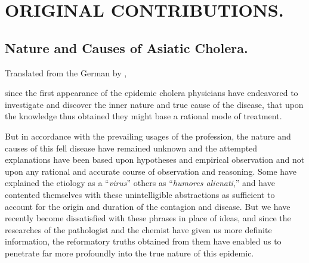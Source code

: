 
\chapter*[Original Contributions.]{ORIGINAL CONTRIBUTIONS.}

\section*{Nature and Causes of Asiatic Cholera.}


\footnotesize
\begin{center}Translated from the German by , \md\end{center}
\normalsize

 since the first appearance of the epidemic cholera physicians
have endeavored to investigate and discover the inner nature and true
cause of the disease, that upon the knowledge thus obtained they might
base a rational mode of treatment.

But in accordance with the prevailing usages of the profession, the
nature and causes of this fell disease have remained unknown and the
attempted explanations have been based upon hypotheses and empirical
observation and not upon any rational and accurate course of
observation and reasoning. Some have explained the etiology as
a ``\textit{virus}'' others as ``\textit{humores alienati},'' and have contented themselves
with these unintelligible abstractions as sufficient to account for
the origin and duration of the contagion and disease. But we have
recently become dissatisfied with these phrases in place of ideas, and
since the researches of the pathologist and the chemist have given us
more definite information, the reformatory truths obtained from them
have enabled us to penetrate far more profoundly into the true nature
of this epidemic.
\endinput